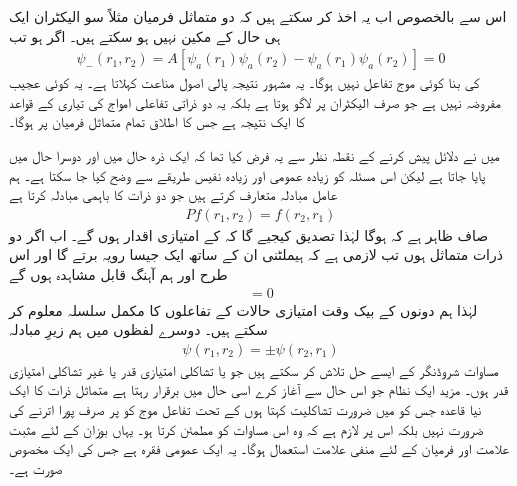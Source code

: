 اس سے بالخصوص اب یہ اخذ کر سکتے ہیں کہ دو متماثل فرمیان مثلاً سو الیکٹران ایک ہی حال کے مکین نہیں ہو سکتے ہیں۔ اگر  ہو تب
\begin{align*}
	\psi_{-}(r_1, r_2)=A[\psi_a(r_1)\psi_a(r_2)-\psi_a(r_1)\psi_a(r_2)]=0
\end{align*}
کی بنا کوئی موج تفاعل نہیں ہوگا۔ یہ مشہور نتیجہ پالی  اصول  مناعت کہلاتا ہے۔ یہ کوئی عجیب مفروضہ نہیں ہے جو صرف الیکٹران پر لاگو ہوتا ہے بلکہ یہ دو ذراتی تفاعلی امواج کی تیاری کے قواعد کا ایک نتیجہ ہے جس کا اطلاق تمام متماثل فرمیان  پر ہوگا۔

میں نے دلائل پیش کرنے کے نقطہ نظر سے یہ فرض کیا تھا کہ ایک ذرہ حال  میں اور دوسرا حال  میں پایا جاتا ہے لیکن اس مسئلہ کو زیادہ عمومی اور زیادہ نفیس طریقے سے وضح کیا جا سکتا ہے۔ ہم عامل مبادلہ  متعارف کرتے ہیں جو دو ذرات کا باہمی مبادلہ  کرتا ہے
\begin{align}
	Pf(r_1, r_2)=f(r_2, r_1)
\end{align}
صاف ظاہر ہے کہ  ہوگا لہٰذا تصدیق کیجیے گا کہ  کے امتیازی اقدار  ہوں گے۔ اب اگر دو ذرات متماثل ہوں تب لازمی ہے کہ ہیملٹنی ان کے ساتھ ایک جیسا رویہ برتے گا  اور  اس طرح  اور  ہم آہنگ  قابل مشاہدہ  ہوں گے
\begin{align}
	[P, H]=0
\end{align}
لہٰذا ہم دونوں کے بیک وقت امتیازی حالات کے تفاعلوں کا مکمل سلسلہ معلوم کر سکتے ہیں۔ دوسرے لفظوں میں ہم زیرِ مبادلہ 
\begin{align}
	\psi(r_1, r_2)=\pm\psi(r_2, r_1)
\end{align}
مساوات شروڈنگر کے ایسے حل تلاش کر سکتے ہیں جو یا تشاکلی امتیازی قدر  یا غیر تشاکلی امتیازی قدر  ہوں۔ مزید ایک نظام جو اس حال سے آغاز کرے اسی حال میں برقرار رہتا ہے متماثل ذرات کا ایک نیا قاعدہ جس کو میں ضرورت   تشاکلیت  کہتا ہوں کے تحت تفاعل موج کو  پر صرف پورا  اترنے کی ضرورت نہیں بلکہ اس پر لازم ہے کہ وہ اس مساوات کو مطمئن کرتا ہو۔ یہاں بوزان کے لئے مثبت علامت اور فرمیان کے لئے منفی علامت استعمال ہوگا۔ یہ ایک عمومی فقرہ ہے جس کی  ایک مخصوص صورت ہے۔





